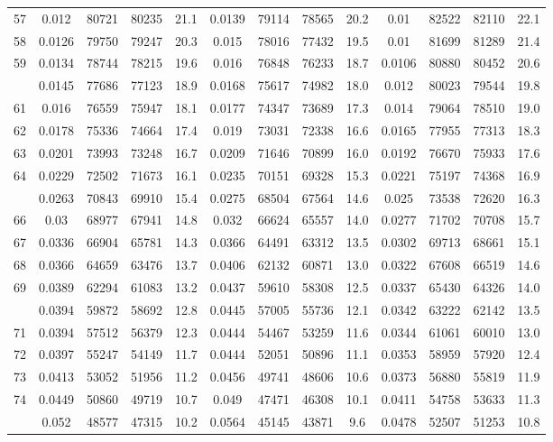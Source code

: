 \documentclass[
  14pt,
]{article}
\begin{document}
\begin{longtable}[t]{lcccccccccccc}
57 & 0.012 & 80721 & 80235 & 21.1 & 0.0139 & 79114 & 78565 & 20.2 & 0.01 & 82522 & 82110 & 22.1\\
58 & 0.0126 & 79750 & 79247 & 20.3 & 0.015 & 78016 & 77432 & 19.5 & 0.01 & 81699 & 81289 & 21.4\\
59 & 0.0134 & 78744 & 78215 & 19.6 & 0.016 & 76848 & 76233 & 18.7 & 0.0106 & 80880 & 80452 & 20.6\\
\addlinespace
60 & 0.0145 & 77686 & 77123 & 18.9 & 0.0168 & 75617 & 74982 & 18.0 & 0.012 & 80023 & 79544 & 19.8\\
61 & 0.016 & 76559 & 75947 & 18.1 & 0.0177 & 74347 & 73689 & 17.3 & 0.014 & 79064 & 78510 & 19.0\\
62 & 0.0178 & 75336 & 74664 & 17.4 & 0.019 & 73031 & 72338 & 16.6 & 0.0165 & 77955 & 77313 & 18.3\\
63 & 0.0201 & 73993 & 73248 & 16.7 & 0.0209 & 71646 & 70899 & 16.0 & 0.0192 & 76670 & 75933 & 17.6\\
64 & 0.0229 & 72502 & 71673 & 16.1 & 0.0235 & 70151 & 69328 & 15.3 & 0.0221 & 75197 & 74368 & 16.9\\
\addlinespace
65 & 0.0263 & 70843 & 69910 & 15.4 & 0.0275 & 68504 & 67564 & 14.6 & 0.025 & 73538 & 72620 & 16.3\\
66 & 0.03 & 68977 & 67941 & 14.8 & 0.032 & 66624 & 65557 & 14.0 & 0.0277 & 71702 & 70708 & 15.7\\
67 & 0.0336 & 66904 & 65781 & 14.3 & 0.0366 & 64491 & 63312 & 13.5 & 0.0302 & 69713 & 68661 & 15.1\\
68 & 0.0366 & 64659 & 63476 & 13.7 & 0.0406 & 62132 & 60871 & 13.0 & 0.0322 & 67608 & 66519 & 14.6\\
69 & 0.0389 & 62294 & 61083 & 13.2 & 0.0437 & 59610 & 58308 & 12.5 & 0.0337 & 65430 & 64326 & 14.0\\
\addlinespace
70 & 0.0394 & 59872 & 58692 & 12.8 & 0.0445 & 57005 & 55736 & 12.1 & 0.0342 & 63222 & 62142 & 13.5\\
71 & 0.0394 & 57512 & 56379 & 12.3 & 0.0444 & 54467 & 53259 & 11.6 & 0.0344 & 61061 & 60010 & 13.0\\
72 & 0.0397 & 55247 & 54149 & 11.7 & 0.0444 & 52051 & 50896 & 11.1 & 0.0353 & 58959 & 57920 & 12.4\\
73 & 0.0413 & 53052 & 51956 & 11.2 & 0.0456 & 49741 & 48606 & 10.6 & 0.0373 & 56880 & 55819 & 11.9\\
74 & 0.0449 & 50860 & 49719 & 10.7 & 0.049 & 47471 & 46308 & 10.1 & 0.0411 & 54758 & 53633 & 11.3\\
\addlinespace
75 & 0.052 & 48577 & 47315 & 10.2 & 0.0564 & 45145 & 43871 & 9.6 & 0.0478 & 52507 & 51253 & 10.8\\

\end{longtable}
\end{document}
